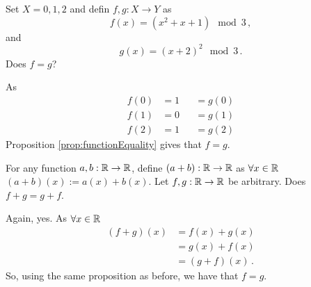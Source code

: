 \guard




\begin{exmp}
\label{exmp:functionEquality}
  Set $X = {0,1,2}$ and defin $f,g:X\to Y$ as \[ f(x) = (x^2+x+1)\mod 3\,,\] and \[ g(x) = (x+2)^2 \mod 3\,.\]
  Does $f=g$?

  As
  \begin{align*}
    f(0)  &= 1  &&= g(0) \\
    f(1)  &= 0  &&= g(1) \\
    f(2)  &= 1  &&= g(2)
  \end{align*}
  Proposition \ref{prop:functionEquality} gives that $f=g$.


  For any function $a,b:\mathbb{R}\to\mathbb{R}$, define $(a+b):\mathbb{R}\to\mathbb{R}$ as $\forall x\in \mathbb{R}$ $(a+b)(x) := a(x) + b(x)$.
  Let $f,g:\mathbb{R}\to\mathbb{R}$ be arbitrary.
  Does $f+g = g+f$.

  Again, yes.
  As $\forall x\in \mathbb{R}$
  \begin{align*}
    (f+g)(x)  &= f(x) + g(x) \\
              &= g(x) + f(x) \\
              &= (g+f)(x)\,.
  \end{align*}
  So, using the same proposition as before, we have that $f=g$.
\end{exmp}
